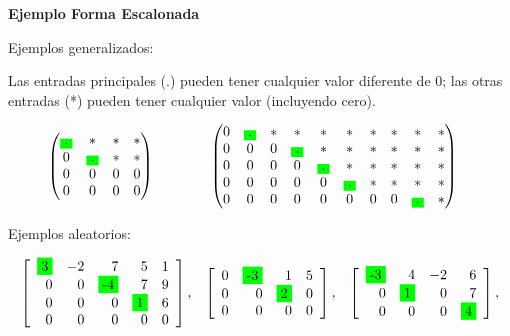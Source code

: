 \documentclass{article}
\begin{document}
\begin{large}
    \textbf{Ejemplo Forma Escalonada}
\end{large}

Ejemplos generalizados:

Las entradas principales (.) pueden tener cualquier valor diferente de 0; las otras entradas (*) pueden tener cualquier valor (incluyendo cero).

\begin{alignat*}{2}
    \begin{pmatrix}
        \colorbox{green}{.}&*&*&*\\
        0&\colorbox{green}{.}&*&*\\
        0&0&0&0\\
        0&0&0&0
    \end{pmatrix}
    & \hspace{ 4em}%
    \begin{pmatrix}
        0&\colorbox{green}{.}&*&*&*&*&*&*&*&*\\
        0&0&0&\colorbox{green}{.}&*&*&*&*&*&*\\
        0&0&0&0&\colorbox{green}{.}&*&*&*&*&*\\
        0&0&0&0&0&\colorbox{green}{.}&*&*&*&*\\
        0&0&0&0&0&0&0&0&\colorbox{green}{.}&*
    \end{pmatrix}
\end{alignat*}

Ejemplos aleatorios:

\begin{equation*}
    \begin{array}{lrl}
        {\left[\begin{array}{rrrrr}
        \colorbox{green}{3} & -2 & 7 & 5 & 1 \\
        0 & 0 & \colorbox{green}{-4} & 7 & 9 \\
        0 & 0 & 0 & \colorbox{green}{1} & 6 \\
        0 & 0 & 0 & 0 & 0
        \end{array}\right],} 
        & {\left[\begin{array}{rrrr}
        0 & \colorbox{green}{-3} & 1 & 5 \\
        0 & 0 & \colorbox{green}{2} & 0 \\
        0 & 0 & 0 & 0
        \end{array}\right],} 
        & {\left[\begin{array}{rrrr}
        \colorbox{green}{-3} & 4 & -2 & 6 \\
        0 & \colorbox{green}{1} & 0 & 7 \\
        0 & 0 & 0 & \colorbox{green}{4}
        \end{array}\right],} 
    \end{array}
\end{equation*}
\end{document}
